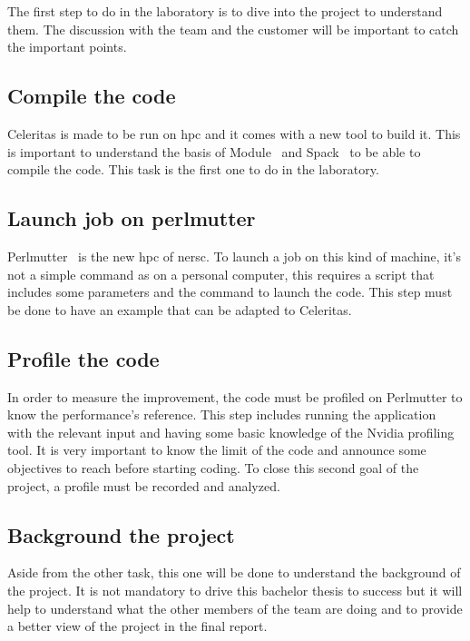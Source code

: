 The first step to do in the laboratory is to dive into the project to understand them.
The discussion with the team and the customer will be important to catch the important points.


\subsection{Compile the code}
\label{spec:ch:activities:understand-the-project:compile-the-code}

Celeritas is made to be run on \acrshort{hpc} and it comes with a new tool to build it.
This is important to understand the basis of Module~\cite{Module} and Spack~\cite{Spack} to be able to compile the code.
This task is the first one to do in the laboratory.


\subsection{Launch job on perlmutter}
\label{spec:ch:activities:understand-the-project:launch-job-on-perlmutter}
Perlmutter~\cite{Perlmutter} is the new \acrshort{hpc} of \acrshort{nersc}.
To launch a job on this kind of machine, it's not a simple command as on a personal computer, this requires a script that includes some parameters and the command to launch the code.
This step must be done to have an example that can be adapted to Celeritas.


\subsection{Profile the code}
\label{specspec:ch:activities:understand-the-project:profile-the-code}

In order to measure the improvement, the code must be profiled on Perlmutter to know the performance's reference.
This step includes running the application with the relevant input and having some basic knowledge of the Nvidia profiling tool.
It is very important to know the limit of the code and announce some objectives to reach before starting coding.
To close this second goal of the project, a profile must be recorded and analyzed.


\subsection{Background the project}
\label{spec:ch:activities:understand-the-project:background-the-project}

Aside from the other task, this one will be done to understand the background of the project.
It is not mandatory to drive this bachelor thesis to success but it will help to understand what the other members of the team are doing and to provide a better view of the project in the final report.



